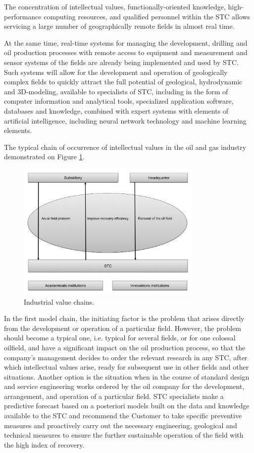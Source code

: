 \documentclass[12pt]{report}
\theoremstyle{definition}
\begin{document}
The concentration of intellectual values, functionally-oriented knowledge, high-performance computing resources, and qualified personnel within the STC allows servicing a large number of geographically remote fields in almost real time.

At the same time, real-time systems for managing the development, drilling and oil production processes with remote access to equipment and measurement and sensor systems of the fields are already being implemented and used by STC.
Such systems will allow for the development and operation of geologically complex fields to quickly attract the full potential of geological, hydrodynamic and 3D-modeling, available to specialists of STC, including in the form of computer information and analytical tools, specialized application software, databases and knowledge, combined with expert systems with elements of artificial intelligence, including neural network technology and machine learning elements.

The typical chain of occurrence of intellectual values in the oil and gas industry demonstrated on Figure \ref{fig:int0}.

\begin{figure}[ht]
	\centering     
	\includegraphics[width=0.8\textwidth]{intro_fig_0_eng}   
	\caption{Industrial value chains.}  
	\label{fig:int0} 
\end{figure}  

In the first model chain, the initiating factor is the problem that arises directly from the development or operation of a particular field.
However, the problem should become a typical one, i.e. typical for several fields, or for one colossal oilfield, and have a significant impact on the oil production process, so that the company's management decides to order the relevant research in any STC, after which intellectual values arise, ready for subsequent use in other fields and other situations.
Another option is the situation when in the course of standard design and service engineering works ordered by the oil company for the development, arrangement, and operation of a particular field.
STC specialists make a predictive forecast based on a posteriori models built on the data and knowledge available to the STC and recommend the Customer to take specific preventive measures and proactively carry out the necessary engineering, geological and technical measures to ensure the further sustainable operation of the field with the high index of recovery.
\end{document}
